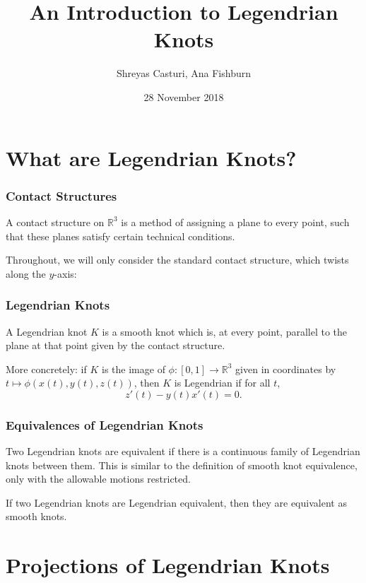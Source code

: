 \documentclass{beamer}
\newcommand{\R}{\mathbb{R}}
\begin{document}
\title{An Introduction to Legendrian Knots}
\author{Shreyas Casturi, Ana Fishburn}
\date{28 November 2018}

\frame{\titlepage}

\section[Intro]{What are Legendrian Knots?}

\begin{frame}
    \frametitle{Contact Structures}
    \begin{definition}
    A \alert{contact structure} on $\R^3$ is a method of assigning a plane
    to every point, such that these planes satisfy certain technical conditions.
    \end{definition}

    Throughout, we will only consider the \alert{standard contact structure}, which
    twists along the $y$-axis:
\end{frame}

\begin{frame}
\frametitle{Legendrian Knots}
    \begin{definition}
    A \alert{Legendrian knot} $K$ is a smooth knot which is, at every point, parallel to the
    plane at that point given by the contact structure.
    \end{definition}

    More concretely: if $K$ is the image of $\phi : [0,1] \to \R^3$ given in coordinates by
    $t \mapsto \phi(x(t),y(t),z(t))$, then $K$
    is Legendrian if for all $t$,
    \[ z'(t) - y(t)x'(t) = 0. \]
\end{frame}

\begin{frame}
    \frametitle{Equivalences of Legendrian Knots}
    Two Legendrian knots are equivalent if there is a continuous family of Legendrian
    knots between them. This is similar to the definition of smooth knot equivalence,
    only with the allowable motions restricted.

    \begin{theorem}
    If two Legendrian knots are Legendrian equivalent, then they are equivalent as smooth knots.
    \end{theorem}
\end{frame}

\section[Proj]{Projections of Legendrian Knots}
\end{document}
